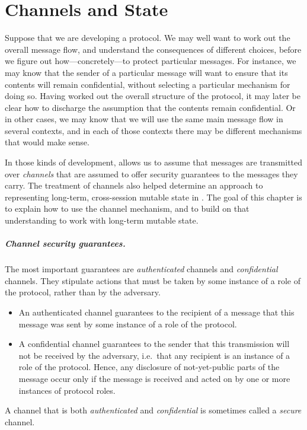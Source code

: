 
\chapter{Channels and State}
\label{chap:channels:state}

Suppose that we are developing a protocol.  We may well want to work
out the overall message flow, and understand the consequences of
different choices, before we figure out how---concretely---to protect
particular messages.  For instance, we may know that the sender of a
particular message will want to ensure that its contents will remain
confidential, without selecting a particular mechanism for doing so.
Having worked out the overall structure of the protocol, it may later
be clear how to discharge the assumption that the contents remain
confidential.  Or in other cases, we may know that we will use the
same main message flow in several contexts, and in each of those
contexts there may be different mechanisms that would make sense.

In those kinds of development, {\cpsa} allows us to assume that
messages are transmitted over \emph{channels} that are assumed to
offer security guarantees to the messages they carry.  The treatment
of channels also helped determine an approach to representing
long-term, cross-session mutable state in {\cpsa}.  The goal of this
chapter is to explain how to use the {\cpsa} channel mechanism, and to
build on that understanding to work with long-term mutable state.

\paragraph{Channel security guarantees.}  The most important
guarantees are \emph{authenticated} channels and \emph{confidential}
channels.  They stipulate actions that must be taken by some instance
of a role of the protocol, rather than by the adversary.
%
\begin{itemize}
  \item An authenticated channel guarantees to the recipient of a
  message that this message was sent by some instance of a role of the
  protocol.
  \item A confidential channel guarantees to the sender that this
  transmission will not be received by the adversary, i.e.~that any
  recipient is an instance of a role of the protocol.  Hence, any
  disclosure of not-yet-public parts of the message occur only if the
  message is received and acted on by one or more instances of
  protocol roles.  

\end{itemize}
%
A channel that is both \emph{authenticated} and \emph{confidential} is
sometimes called a \emph{secure} channel.

